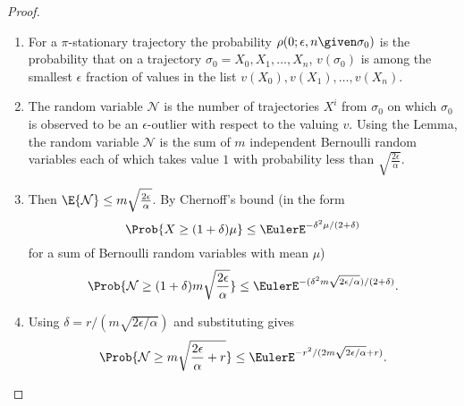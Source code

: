\documentclass[12pt]{article}
\begin{document}
\begin{proof}
    \begin{enumerate}
        \item
            For a \( \pi \)-stationary trajectory the probability \(
            \rho(0; \epsilon, n \given \sigma_0) \) is the probability
            that on a trajectory \( \sigma_0 = X_0, X_1, \dots, X_n \), \(
            v(\sigma_0) \) is among the smallest \( \epsilon \) fraction
            of values in the list \( v(X_0), v(X_1), \dots, v(X_n) \).
        \item
            The random variable \( \mathcal{N} \) is the number of
            trajectories \( X^i \) from \( \sigma_0 \) on which \(
            \sigma_0 \) is observed to be an \( \epsilon \)-outlier with
            respect to the valuing \( v \).  Using the Lemma, the random
            variable \( \mathcal{N} \) is the sum of \( m \) independent
            Bernoulli random variables each of which takes value \( 1 \)
            with probability less than \( \sqrt{\frac{2 \epsilon}{\alpha}}
            \).
        \item
            Then \( \E{\mathcal{N}} \le m \sqrt{\frac{2 \epsilon}{\alpha}}
            \). By Chernoff's bound (in the form
            \[
                \Prob{X \ge (1 + \delta) \mu } \le \EulerE^{-\delta^2\mu/
                (2 + \delta)}
            \] for a sum of Bernoulli random variables with mean \( \mu \))
            \[
                \Prob{\mathcal{N} \ge (1 + \delta) m \sqrt{\frac{2\epsilon}
                {\alpha}} } \le \EulerE^{ -(\delta^{2} m\sqrt{2\epsilon/\alpha})/
                (2 + \delta)}.
            \]
        \item
            Using \( \delta = r/(m \sqrt{2\epsilon/\alpha}) \) and
            substituting gives
            \[
                \Prob{\mathcal{N} \ge m \sqrt{\frac{2\epsilon}{\alpha} +
                r} } \le \EulerE^{ -r^{2}/ (2 m\sqrt{2\epsilon/\alpha} +
                r)}.
            \]
    \end{enumerate}
\end{proof}

\end{document}
